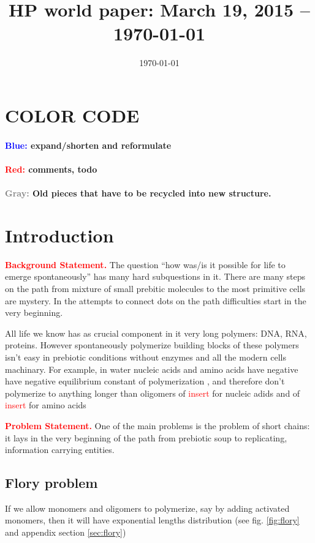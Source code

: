 \documentclass[12pt]{paper}
\title{HP world paper: March 19, 2015 -- \today}
\author{}
\date{\today}
\newcommand{\red}[1]{\textcolor{red}{#1}}
\newcommand{\gray}[1]{\textcolor{gray}{#1}}
\begin{document}
 \maketitle
 \tableofcontents
 
 \section*{COLOR CODE}
\paragraph{\textcolor{blue}{Blue: } expand/shorten and reformulate}
\paragraph{\red{Red: }comments, todo}
\paragraph{\gray{Gray: }Old pieces that have to be recycled into new structure.}
 
\section{Introduction} 

\noindent\red{\textbf{Background Statement.}} The question ``how was/is it possible for life to emerge spontaneously'' has many hard subquestions in it. There are many steps on the path from mixture of small prebitic molecules to the most primitive cells are mystery. In the attempts to connect dots on the path difficulties start in the very beginning. 

All life we know has as crucial component in it very long polymers: DNA, RNA, proteins. However spontaneously polymerize building blocks of these polymers isn't easy in prebiotic conditions without enzymes and all the modern cells machinary. For example, in water nucleic acids and amino acids have negative have negative equilibrium constant of polymerization \cite{}, \cite{Shock1992,Martin1998} and therefore don't polymerize to anything longer than oligomers of \red{insert} for nucleic adids \cite{} and of \red{insert} for amino acids \cite{Lambert2008}

\noindent\red{\textbf{Problem Statement.}} One of the main problems is the problem of short 
chains: it lays in the very beginning of the path from prebiotic soup to replicating, information 
carrying entities. 
\subsection{Flory problem}
If we allow monomers and oligomers to polymerize, say by adding activated monomers, then it will 
have exponential lengths distribution (see fig. \ref{fig:flory} and appendix section 
\ref{sec:flory})
\end{document}
